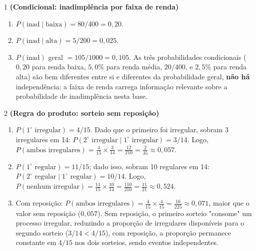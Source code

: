 \documentclass[11pt]{article}
\begin{document}

\begin{questao}{1} \textbf{(Condicional: inadimplência por faixa de renda)}
\begin{solucao}
\begin{enumerate}[label=(\alph*)]
  \item $P(\text{inad}\mid\text{baixa}) = 80/400 = 0{,}20$.
  \item $P(\text{inad}\mid\text{alta}) = 5/200 = 0{,}025$.
  \item $P(\text{inad})$ geral $=105/1000=0{,}105$. As três probabilidades condicionais
    ($0{,}20$ para renda baixa, $5{,}0\%$ para renda média, $20/400$, e $2{,}5\%$ para renda alta)
    são bem diferentes entre si e diferentes da probabilidade geral, \textbf{não há} independência:
    a faixa de renda carrega informação relevante sobre a probabilidade de inadimplência nesta
    base.
\end{enumerate}
\end{solucao}
\end{questao}

\begin{questao}{2} \textbf{(Regra do produto: sorteio sem reposição)}
\begin{solucao}
\begin{enumerate}[label=(\alph*)]
  \item $P(1^\circ\text{ irregular}) = 4/15$. Dado que o primeiro foi irregular, sobram 3
    irregulares em 14: $P(2^\circ\text{ irregular}\mid 1^\circ\text{ irregular}) = 3/14$. Logo,
    $P(\text{ambos irregulares}) = \frac{4}{15}\times\frac{3}{14} = \frac{12}{210} = \frac{2}{35}
    \approx 0{,}057$.
  \item $P(1^\circ\text{ regular})=11/15$; dado isso, sobram 10 regulares em 14:
    $P(2^\circ\text{ regular}\mid 1^\circ\text{ regular})=10/14$. Logo,
    $P(\text{nenhum irregular}) = \frac{11}{15}\times\frac{10}{14} = \frac{110}{210} =
    \frac{11}{21} \approx 0{,}524$.
  \item Com reposição: $P(\text{ambos irregulares}) = \frac{4}{15}\times\frac{4}{15} =
    \frac{16}{225}\approx 0{,}071$, maior que o valor sem reposição ($0{,}057$). Sem reposição, o
    primeiro sorteio "consome" um processo irregular, reduzindo a proporção de irregulares
    disponíveis para o segundo sorteio ($3/14 < 4/15$), com reposição, a proporção permanece
    constante em $4/15$ nos dois sorteios, sendo eventos independentes.
\end{enumerate}
\end{solucao}
\end{questao}
\end{document}
